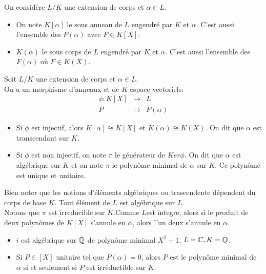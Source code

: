 \begin{definition}
	On considère $L/K$ une extension de corps et $\alpha \in L$. \\
	\begin{itemize}
		\item On note $K[\alpha]$ le sous anneau de $L$ engendré par $K$ et $\alpha$. C'est aussi l'ensemble des $P(\alpha)$ avec $P \in K[X]$:
		\item $K(\alpha)$ le sous corps de $L$ engendré par $K$ et $\alpha$. C'est aussi l'ensemble des $F(\alpha)$ où $F \in K(X)$.
	\end{itemize}
\end{definition}


\begin{definition}
	Soit $L/K$ une extension de corps et $\alpha \in L$.\\
	On a un morphisme d'anneaux et de $K$ espace vectoriels:
	\begin{eqnarray*}
		\phi: K[X] &\to& L \\
		P &\mapsto& P(\alpha)
	\end{eqnarray*}
	\begin{itemize}
		\item Si $\phi$ est injectif, alors $K[\alpha] \cong K[X]$ et $K(\alpha) \cong K(X)$. On dit que $\alpha$ est transcendant sur $K$.
		\item Si $\phi$ est non injectif, on note $\pi$ le générateur de $Ker \phi$. On dit que $\alpha$ est algébrique sur $K$ et on note $\pi$ le polynôme minimal de
		      $\alpha$ sur $K$. Ce polynôme est unique et unitaire.
	\end{itemize}
\end{definition}

\begin{remarque}
	Bien noter que les notions d'éléments algébriques ou trascendente dépendent du corps de base $K$. Tout élément de $L$ est algébrique sur $L$.\\
	Notons que $\pi$ est irreducible sur $K$.Comme $L$est integre, alors si le produit de deux polynômes de $K[X]$ s'annule en $\alpha$, alors l'un deux s'annule en $\alpha$.
\end{remarque}

\begin{example}
	\begin{itemize}
		\item $i$ est algébrique sur $\mathbb{Q}$ de polynôme minimal $X^2+1$, $L = \mathbb{C}, K = \mathbb{Q}$.
		\item Si $P \in [X]$ unitaire tel que $P(\alpha) = 0$, alors $P$ est le polynôme minimal de $\alpha$ si et seulement si $P$ est irréductible sur $K$.
	\end{itemize}
\end{example}

